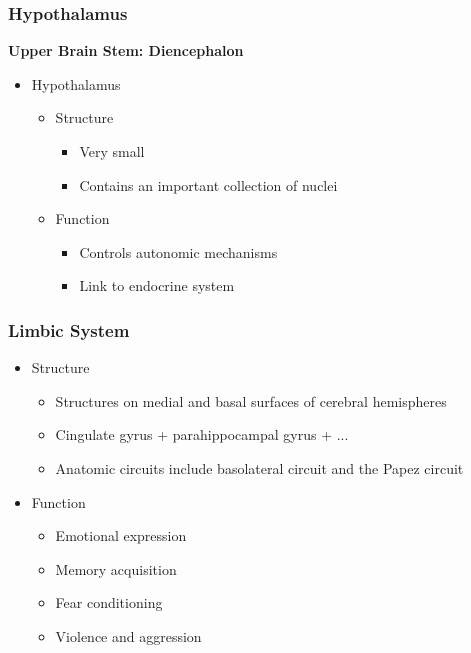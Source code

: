 \documentclass{article}
\begin{document}
    \subsubsection{Hypothalamus}
    
    \noindent \textbf{Upper Brain Stem: Diencephalon}
    
    \begin{itemize}
        \item Hypothalamus
          \begin{itemize}
            \item Structure
              \begin{itemize}
                \item Very small
                \item Contains an important collection of nuclei
              \end{itemize}
            \item Function
              \begin{itemize}
                \item Controls autonomic mechanisms
                \item Link to endocrine system
              \end{itemize}
          \end{itemize}
    \end{itemize}
    
    \subsubsection{Limbic System}
    
    \begin{itemize}
        \item Structure
          \begin{itemize}
            \item Structures on medial and basal surfaces of cerebral hemispheres
            \item Cingulate gyrus + parahippocampal gyrus + ...
            \item Anatomic circuits include basolateral circuit and the Papez circuit
          \end{itemize}
        \item Function
          \begin{itemize}
            \item Emotional expression
            \item Memory acquisition
            \item Fear conditioning
            \item Violence and aggression
          \end{itemize}
    \end{itemize}
    
\end{document}
